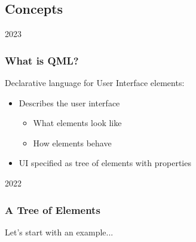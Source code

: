 %
%
%
%


\subsection{Concepts}
\begin{slide}{2023}\frametitle{What is QML?}
\vspace*{0.5em}

Declarative language for User Interface elements:

\vspace*{0.5em}
\begin{itemize}
    \item Describes the user interface
    \begin{itemize}
    \item What elements look like
    \item How elements behave
    \end{itemize}
\item UI specified as tree of elements with properties     
\end{itemize}

\end{slide}


\begin{slide}{2022}\frametitle{A Tree of Elements}


                               

\vspace*{1em}
Let's start with an example...

\end{slide}

